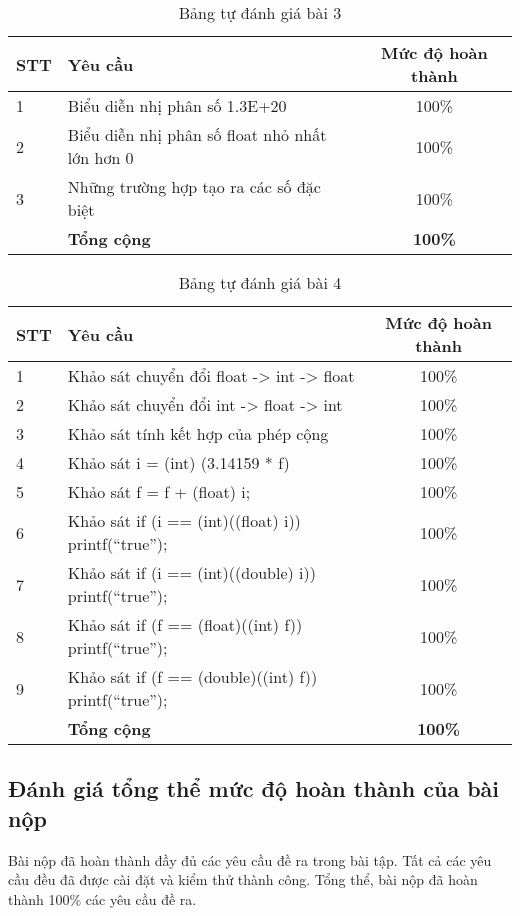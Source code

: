 \begin{center}
    \begin{table}[H]
        \centering
        \caption{Bảng tự đánh giá bài 3}
        \renewcommand{\arraystretch}{1.4}
        \begin{tabular}{|l|p{}|c|}
        \hline
        \textbf{STT} & \textbf{Yêu cầu}            & \textbf{Mức độ hoàn thành} \\ \hline
        1            &  Biểu diễn nhị phân số 1.3E+20   & 100\%          \\ \hline
        2            &  Biểu diễn nhị phân số float nhỏ nhất lớn hơn 0     & 100\%          \\ \hline
        3            &  Những trường hợp tạo ra các số đặc biệt      & 100\%          \\ \hline
                    & \textbf{Tổng cộng}               &\textbf{100\%}           \\ \hline
      \end{tabular}
        \label{tab:mytable2}
    \end{table}

    \begin{table}[H]
      \centering
      \caption{Bảng tự đánh giá bài 4}
      \renewcommand{\arraystretch}{1.4}
      \begin{tabular}{|l|p{}|c|}
      \hline
      \textbf{STT} & \textbf{Yêu cầu}            & \textbf{Mức độ hoàn thành} \\ \hline
      1            &  Khảo sát chuyển đổi float -> int -> float     & 100\%         \\ \hline
      2            &  Khảo sát chuyển đổi int -> float -> int     & 100\%          \\ \hline
      3            &  Khảo sát tính kết hợp của phép cộng      & 100\%          \\ \hline
      4            &  Khảo sát i = (int) (3.14159 * f)      & 100\%          \\ \hline
      5            &  Khảo sát f = f + (float) i;       & 100\%          \\ \hline
      6            &  Khảo sát if (i == (int)((float) i)) { printf(“true”); }       & 100\%          \\ \hline
      7            &  Khảo sát if (i == (int)((double) i)) { printf(“true”); }      & 100\%          \\ \hline
      8            &  Khảo sát if (f == (float)((int) f)) { printf(“true”); }       & 100\%          \\ \hline
      9            &  Khảo sát if (f == (double)((int) f)) { printf(“true”); }       & 100\%          \\ \hline

                  & \textbf{Tổng cộng}               &\textbf{100\%}           \\ \hline
    \end{tabular}
      \label{tab:mytable2}
  \end{table}
\end{center}

\subsection{Đánh giá tổng thể mức độ hoàn thành của bài nộp}

Bài nộp đã hoàn thành đầy đủ các yêu cầu đề ra trong bài tập. Tất cả các yêu cầu đều đã được cài đặt và kiểm thử thành công. Tổng thể, bài nộp đã hoàn thành 100\% các yêu cầu đề ra.
